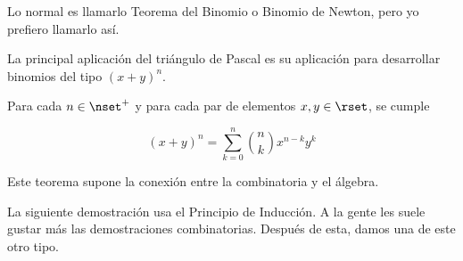 Lo normal es llamarlo Teorema del Binomio o Binomio de Newton, pero yo
prefiero llamarlo así.

La principal aplicación del triángulo de Pascal es su aplicación para
desarrollar binomios del tipo $(x + y)^n$.

\begin{theorem}
  Para cada $n \in \nset^{+}$ y para cada par de elementos $x, y \in \rset$,
  se cumple

  $$ (x + y)^n = \sum_{k=0}^n {n \choose k} x^{n-k} y^k $$
\end{theorem}

Este teorema supone la conexión entre la combinatoria y el álgebra.

La siguiente demostración usa el Principio de Inducción. A la gente les
suele gustar más las demostraciones combinatorias. Después de esta, damos
una de este otro tipo.


